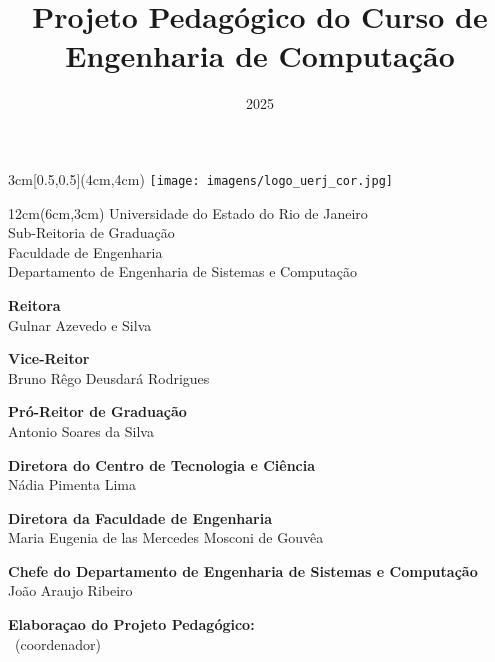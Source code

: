 \documentclass[oneside,envcountsame,envcountchap,openany]{svmono}
\begin{document}


\begin{textblock*}{3cm}[0.5,0.5](4cm,4cm)
  \texttt{[image: imagens/logo\_uerj\_cor.jpg]}
\end{textblock*}
\begin{textblock*}{12cm}(6cm,3cm)   %
  Universidade do Estado do Rio de Janeiro\\
  Sub-Reitoria de Graduação \\
  Faculdade de Engenharia\\
  Departamento de Engenharia de Sistemas e Computação
\end{textblock*}

\title{Projeto Pedagógico do Curso de Engenharia de Computação}
\subtitle{2025}
\date{} %
\maketitle
\vfill
\thispagestyle{empty} %
\newpage

{\textbf{Reitora}} \\
Gulnar Azevedo e Silva


  {\textbf{Vice-Reitor}} \\
Bruno Rêgo Deusdará Rodrigues

  {\textbf{Pró-Reitor de Graduação}} \\
Antonio Soares da Silva

  {\textbf{Diretora do Centro de Tecnologia e Ciência}} \\
Nádia Pimenta Lima

  {\textbf{Diretora da Faculdade de Engenharia}} \\
Maria Eugenia de las Mercedes Mosconi de Gouvêa

{\textbf{Chefe do Departamento de Engenharia de Sistemas e Computação}} \\
João Araujo Ribeiro

\thispagestyle{empty}

\vspace*{\fill}


\textbf{Elaboraçao do Projeto Pedagógico:}\\[0.5em]
\araujo~(coordenador)\\
\cristiana\\ \felipe\\ \gabriel\\ \giomar\\ \luiza\\ \luigi\\ \margareth\\ \rafaela\\ \robert\\ \simone\\ \thiago\\[1em]
\end{document}
